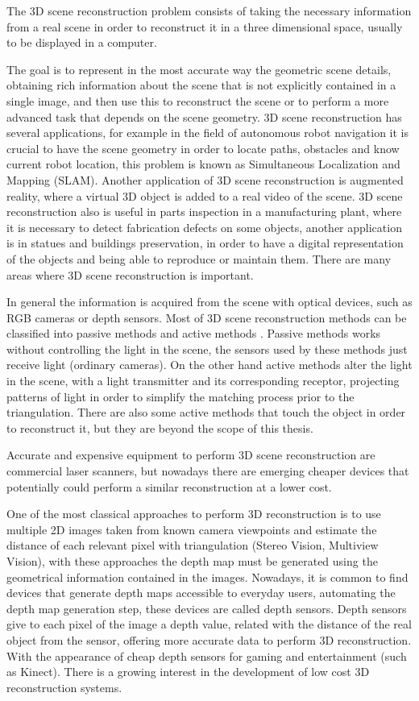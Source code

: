 \indent The 3D scene reconstruction problem consists of taking the
necessary information from a real scene in order to reconstruct
it in a three dimensional space, usually to be displayed 
in a computer. 

The goal is to represent in the most accurate way the geometric scene details, obtaining rich 
information about the scene that is not explicitly contained in a single image, and then use this 
to reconstruct the scene or to perform a more advanced task that depends on the scene geometry. 
3D scene reconstruction has several applications, for example in the field of autonomous robot navigation it is crucial to have 
the scene geometry in order to locate paths, obstacles and know current robot location, this problem is known as 
Simultaneous Localization and Mapping (SLAM). Another application of 3D scene reconstruction is augmented reality, 
where a virtual 3D object is added to a real video of the scene. 3D scene reconstruction also is useful in parts inspection 
in a manufacturing plant, where it is necessary to detect
 fabrication defects on some objects, another application is in statues and buildings preservation, in order to have a digital representation 
of the objects and being able to reproduce or maintain them. There are many areas where 3D scene reconstruction is important.

 
In general the information is acquired
 from the scene with optical devices, such as RGB cameras or depth sensors.
Most of 3D scene reconstruction methods can be classified into passive methods and active methods \cite{lanman}.
Passive methods works without controlling the light in the scene, the sensors used by these methods just receive light (ordinary cameras). 
On the other hand active methods alter the light in the scene, with a light transmitter and its corresponding 
receptor, projecting patterns of light in order to simplify the matching process prior to the triangulation. 
There are also some active methods that touch the object in order to reconstruct it, but they are beyond 
the scope of this thesis. 

Accurate and expensive equipment to perform 3D scene reconstruction are commercial laser scanners,
 but nowadays there are emerging cheaper devices that 
potentially could perform 
a similar reconstruction at a lower cost.

One of the most classical approaches to perform 3D reconstruction is to use multiple 2D
 images taken from known camera viewpoints and estimate the distance of each
 relevant pixel with triangulation (Stereo Vision, Multiview Vision), with these 
approaches the depth map must be generated using the geometrical information contained
 in the images. Nowadays, it is common to find devices that generate depth maps accessible
 to everyday users, automating the depth map generation step, these devices are called depth sensors. 
Depth sensors give to each pixel of the image a depth value, related
with the distance of the real object from the sensor, offering  more
accurate data to perform 3D reconstruction. With the appearance
of cheap depth sensors for gaming and entertainment (such as
Kinect). There is a growing interest in the development of low cost
3D reconstruction systems. 


